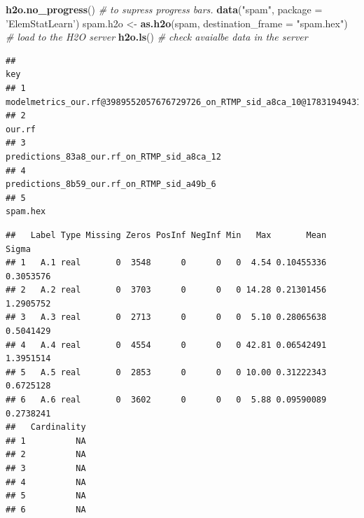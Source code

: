 \documentclass[]{book}
\newenvironment{Shaded}{\begin{snugshade}}{\end{snugshade}}
\newcommand{\CommentTok}[1]{\textcolor[rgb]{0.56,0.35,0.01}{\textit{#1}}}
\newcommand{\DataTypeTok}[1]{\textcolor[rgb]{0.13,0.29,0.53}{#1}}
\newcommand{\KeywordTok}[1]{\textcolor[rgb]{0.13,0.29,0.53}{\textbf{#1}}}
\newcommand{\NormalTok}[1]{#1}
\newcommand{\OperatorTok}[1]{\textcolor[rgb]{0.81,0.36,0.00}{\textbf{#1}}}
\newcommand{\StringTok}[1]{\textcolor[rgb]{0.31,0.60,0.02}{#1}}
\theoremstyle{definition}
\theoremstyle{definition}
\theoremstyle{definition}
\theoremstyle{remark}
\begin{document}
\begin{Shaded}
\begin{Highlighting}[]
\KeywordTok{h2o.no_progress}\NormalTok{() }\CommentTok{# to supress progress bars. }
\KeywordTok{data}\NormalTok{(}\StringTok{"spam"}\NormalTok{, }\DataTypeTok{package =} \StringTok{'ElemStatLearn'}\NormalTok{)}
\NormalTok{spam.h2o <-}\StringTok{ }\KeywordTok{as.h2o}\NormalTok{(spam, }\DataTypeTok{destination_frame =} \StringTok{"spam.hex"}\NormalTok{) }\CommentTok{# load to the H2O server}
\KeywordTok{h2o.ls}\NormalTok{() }\CommentTok{# check avaialbe data in the server}
\end{Highlighting}
\end{Shaded}

\begin{verbatim}
##                                                                               key
## 1 modelmetrics_our.rf@3989552057676729726_on_RTMP_sid_a8ca_10@1783194943144526592
## 2                                                                          our.rf
## 3                                     predictions_83a8_our.rf_on_RTMP_sid_a8ca_12
## 4                                      predictions_8b59_our.rf_on_RTMP_sid_a49b_6
## 5                                                                        spam.hex
\end{verbatim}

\begin{Shaded}
\end{Shaded}

\begin{verbatim}
##   Label Type Missing Zeros PosInf NegInf Min   Max       Mean     Sigma
## 1   A.1 real       0  3548      0      0   0  4.54 0.10455336 0.3053576
## 2   A.2 real       0  3703      0      0   0 14.28 0.21301456 1.2905752
## 3   A.3 real       0  2713      0      0   0  5.10 0.28065638 0.5041429
## 4   A.4 real       0  4554      0      0   0 42.81 0.06542491 1.3951514
## 5   A.5 real       0  2853      0      0   0 10.00 0.31222343 0.6725128
## 6   A.6 real       0  3602      0      0   0  5.88 0.09590089 0.2738241
##   Cardinality
## 1          NA
## 2          NA
## 3          NA
## 4          NA
## 5          NA
## 6          NA
\end{verbatim}
\end{document}
